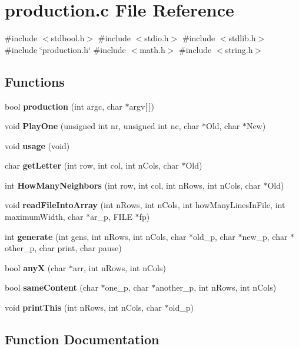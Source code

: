 \section{production.\+c File Reference}
\label{production_8c}
{\ttfamily \#include $<$stdbool.\+h$>$}\newline
{\ttfamily \#include $<$stdio.\+h$>$}\newline
{\ttfamily \#include $<$stdlib.\+h$>$}\newline
{\ttfamily \#include \char`\"{}production.\+h\char`\"{}}\newline
{\ttfamily \#include $<$math.\+h$>$}\newline
{\ttfamily \#include $<$string.\+h$>$}\newline
\subsection*{Functions}
\begin{DoxyCompactItemize}
\item 
bool \textbf{ production} (int argc, char $\ast$argv[$\,$])
\item 
void \textbf{ Play\+One} (unsigned int nr, unsigned int nc, char $\ast$Old, char $\ast$New)
\item 
void \textbf{ usage} (void)
\item 
char \textbf{ get\+Letter} (int row, int col, int n\+Cols, char $\ast$Old)
\item 
int \textbf{ How\+Many\+Neighbors} (int row, int col, int n\+Rows, int n\+Cols, char $\ast$Old)
\item 
void \textbf{ read\+File\+Into\+Array} (int n\+Rows, int n\+Cols, int how\+Many\+Lines\+In\+File, int maximum\+Width, char $\ast$ar\+\_\+p, F\+I\+LE $\ast$fp)
\item 
int \textbf{ generate} (int gens, int n\+Rows, int n\+Cols, char $\ast$old\+\_\+p, char $\ast$new\+\_\+p, char $\ast$other\+\_\+p, char print, char pause)
\item 
bool \textbf{ anyX} (char $\ast$arr, int n\+Rows, int n\+Cols)
\item 
bool \textbf{ same\+Content} (char $\ast$one\+\_\+p, char $\ast$another\+\_\+p, int n\+Rows, int n\+Cols)
\item 
void \textbf{ print\+This} (int n\+Rows, int n\+Cols, char $\ast$old\+\_\+p)
\end{DoxyCompactItemize}


\subsection{Function Documentation}
\mbox{\label{production_8c_a85f4ceb7eddb00ab9989daf800a74d3f}} 

